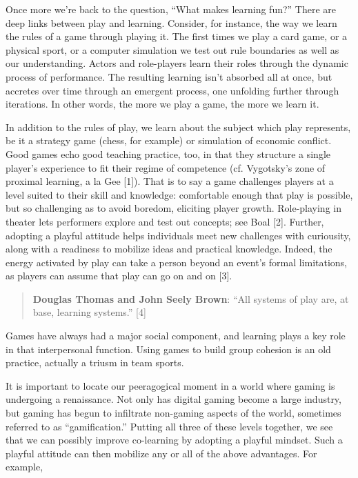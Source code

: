 Once more we're back to the question, ``What makes learning fun?'' There
are deep links between play and learning. Consider, for instance, the
way we learn the rules of a game through playing it. The first times we
play a card game, or a physical sport, or a computer simulation we test
out rule boundaries as well as our understanding. Actors and
role-players learn their roles through the dynamic process of
performance. The resulting learning isn't absorbed all at once, but
accretes over time through an emergent process, one unfolding further
through iterations. In other words, the more we play a game, the more we
learn it.

In addition to the rules of play, we learn about the subject which play
represents, be it a strategy game (chess, for example) or simulation of
economic conflict. Good games echo good teaching practice, too, in that
they structure a single player's experience to fit their regime of
competence (cf. Vygotsky's zone of proximal learning, a la Gee {[}1{]}).
That is to say a game challenges players at a level suited to their
skill and knowledge: comfortable enough that play is possible, but so
challenging as to avoid boredom, eliciting player growth. Role-playing
in theater lets performers explore and test out concepts; see Boal
{[}2{]}. Further, adopting a playful attitude helps individuals meet new
challenges with curiousity, along with a readiness to mobilize ideas and
practical knowledge. Indeed, the energy activated by play can take a
person beyond an event's formal limitations, as players can assume that
play can go on and on {[}3{]}.

\begin{quote}
\textbf{Douglas Thomas and John Seely Brown}: ``All systems of play are,
at base, learning systems.'' {[}4{]}

\end{quote}
Games have always had a major social component, and learning plays a key
role in that interpersonal function. Using games to build group cohesion
is an old practice, actually a triusm in team sports.

It is important to locate our peeragogical moment in a world where
gaming is undergoing a renaissance. Not only has digital gaming become a
large industry, but gaming has begun to infiltrate non-gaming aspects of
the world, sometimes referred to as ``gamification.'' Putting all three
of these levels together, we see that we can possibly improve
co-learning by adopting a playful mindset. Such a playful attitude can
then mobilize any or all of the above advantages. For example,

